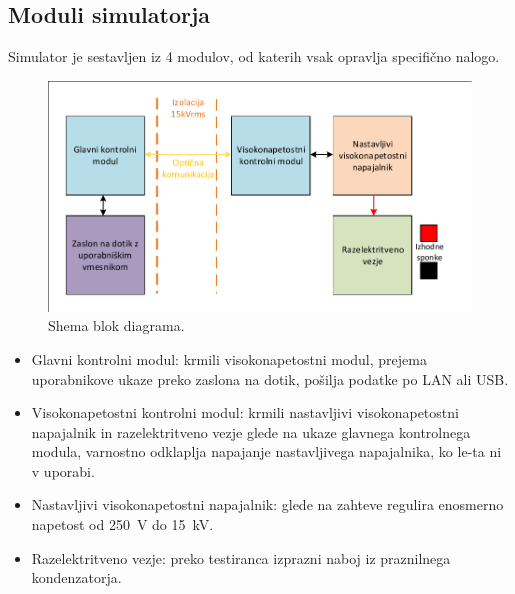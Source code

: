 \documentclass[a4paper,twoside,openright,12pt,Slovene]{book}
\begin{document}
	\subsection{Moduli simulatorja}
	Simulator je sestavljen iz 4 modulov, od katerih vsak opravlja specifično nalogo.
	\begin{figure}[h]
    \centering
    \includegraphics[width=1\columnwidth]{Sheme/Osnovna blok shema poenostavljena.pdf}
    \caption{\label{BlokDiagramShema} Shema blok diagrama.}
	\end{figure}
	
	\begin{itemize}
		\item Glavni kontrolni modul: krmili visokonapetostni modul, prejema uporabnikove ukaze preko zaslona na dotik, pošilja podatke po LAN ali USB.
		\item Visokonapetostni kontrolni modul: krmili nastavljivi visokonapetostni napajalnik in razelektritveno vezje glede na ukaze glavnega kontrolnega modula, varnostno odklaplja napajanje nastavljivega napajalnika, ko le-ta ni v uporabi.
		\item Nastavljivi visokonapetostni napajalnik: glede na zahteve regulira enosmerno napetost od \SI{250}{\volt} do \SI{15}{\kilo\volt}.
		\item Razelektritveno vezje: preko testiranca izprazni naboj iz praznilnega kondenzatorja.
	\end{itemize}
\end{document}
